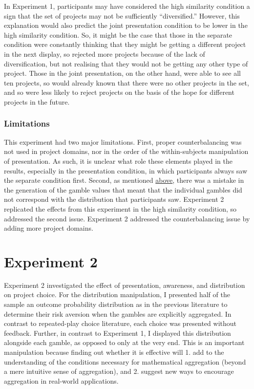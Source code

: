 \documentclass[a4paper, nobind, dvipsnames]{templates/ociamthesis}
\theoremstyle{definition}
\theoremstyle{definition}
\theoremstyle{definition}
\theoremstyle{definition}
\theoremstyle{remark}
\begin{document}
In Experiment 1, participants may have considered the high similarity condition
a sign that the set of projects may not be sufficiently ``diversified.'' However,
this explanation would also predict the joint presentation condition to be lower
in the high similarity condition. So, it might be the case that those in the
separate condition were constantly thinking that they might be getting a
different project in the next display, so rejected more projects because of the
lack of diversification, but not realising that they would not be getting any
other type of project. Those in the joint presentation, on the other hand, were
able to see all ten projects, so would already known that there were no other
projects in the set, and so were less likely to reject projects on the basis of
the hope for different projects in the future.

\subsubsection{Limitations}

This experiment had two major limitations. First, proper counterbalancing was
not used in project domains, nor in the order of the within-subjects
manipulation of presentation. As such, it is unclear what role these elements
played in the results, especially in the presentation condition, in which
participants always saw the separate condition first. Second, as mentioned
\protect\hyperlink{outcome-distribution-materials-aggregation-1}{above}, there was a mistake in the
generation of the gamble values that meant that the individual gambles did not
correspond with the distribution that participants saw. Experiment 2 replicated
the effects from this experiment in the high similarity condition, so addressed
the second issue. Experiment 2 addressed the counterbalancing issue by adding
more project domains.

\section{Experiment 2}

Experiment 2 investigated the effect of presentation, awareness, and
distribution on project choice. For the distribution manipulation, I presented
half of the sample an outcome probability distribution as in the previous
literature \autocites[e.g.,][]{redelmeier1992,webb2017} to determine their risk aversion
when the gambles are explicitly aggregated. In contrast to repeated-play choice
literature, each choice was presented without feedback. Further, in contrast to
Experiment 1, I displayed this distribution alongside each gamble, as opposed to
only at the very end. This is an important manipulation because finding out
whether it is effective will 1. add to the understanding of the conditions
necessary for mathematical aggregation (beyond a mere intuitive sense of
aggregation), and 2. suggest new ways to encourage aggregation in real-world
applications.
\end{document}
